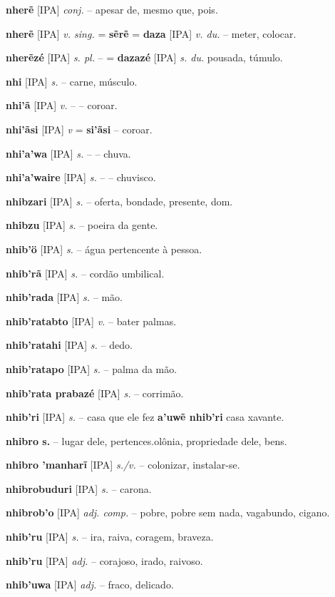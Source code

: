 \textbf{nherẽ} [IPA] \textit{conj.} -- apesar de, mesmo que, pois.

\textbf{nherẽ} [IPA] \textit{v. sing.} = \textbf{sẽrẽ} = \textbf{daza} [IPA] \textit{v. du.} -- meter, colocar.

\textbf{nherẽzé} [IPA] \textit{s. pl.} -- = \textbf{dazazé} [IPA] \textit{s. du.} pousada, túmulo.

\textbf{nhi} [IPA] \textit{s.} -- carne, músculo.

\textbf{nhi'ã} [IPA] \textit{v.} -- -- coroar.

\textbf{nhi'ãsi} [IPA] \textit{v} = \textbf{si'ãsi} -- coroar.

\textbf{nhi'a'wa} [IPA] \textit{s.} -- -- chuva.

\textbf{nhi'a'waire} [IPA] \textit{s.} -- -- chuvisco.

\textbf{nhibzari} [IPA] \textit{s.} -- oferta, bondade, presente, dom.

\textbf{nhibzu} [IPA] \textit{s.} -- poeira da gente.

\textbf{nhib'ö} [IPA] \textit{s.} -- água pertencente à pessoa.

\textbf{nhib'rã} [IPA] \textit{s.} -- cordão umbilical.

\textbf{nhib'rada} [IPA] \textit{s.} -- mão.

\textbf{nhib'ratabto} [IPA] \textit{v.} -- bater palmas.

\textbf{nhib'ratahi} [IPA] \textit{s.} -- dedo.

\textbf{nhib'ratapo} [IPA] \textit{s.} -- palma da mão.

\textbf{nhib'rata prabazé} [IPA] \textit{s.} -- corrimão.

\textbf{nhib'ri} [IPA] \textit{s.} -- casa que ele fez  \textbf{a'uwẽ nhib'ri} casa xavante.

\textbf{nhibro s.} -- lugar dele, pertences.olônia, propriedade dele, bens.

\textbf{nhibro 'manharĩ} [IPA] \textit{s./v.} -- colonizar, instalar-se.

\textbf{nhibrobuduri} [IPA] \textit{s.} -- carona.

\textbf{nhibrob'o} [IPA] \textit{adj. comp.} -- pobre, pobre sem nada, vagabundo, cigano.

\textbf{nhib'ru} [IPA] \textit{s.} -- ira, raiva, coragem, braveza.

\textbf{nhib'ru} [IPA] \textit{adj.} -- corajoso, irado, raivoso.

\textbf{nhib'uwa} [IPA] \textit{adj.} -- fraco, delicado.

